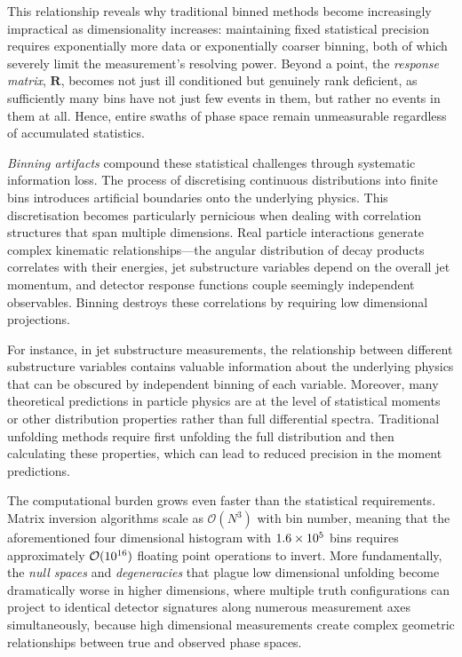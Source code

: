            This relationship reveals why traditional binned methods become increasingly impractical as dimensionality increases: maintaining fixed statistical precision requires exponentially more data or exponentially coarser binning, both of which severely limit the measurement's resolving power.
            Beyond a point, the \textit{response matrix}, \(\mathbf{R}\), becomes not just ill conditioned but genuinely rank deficient, as sufficiently many bins have not just few events in them, but rather no events in them at all.
            Hence, entire swaths of phase space remain unmeasurable regardless of accumulated statistics.
    
            \emph{Binning artifacts} compound these statistical challenges through systematic information loss.
            The process of discretising continuous distributions into finite bins introduces artificial boundaries  onto the underlying physics.
            This discretisation becomes particularly pernicious when dealing with correlation structures that span multiple dimensions.
            Real particle interactions generate complex kinematic relationships---the angular distribution of decay products correlates with their energies, jet substructure variables depend on the overall jet momentum, and detector response functions couple seemingly independent observables.
            Binning destroys these correlations by requiring low dimensional projections.
            
            For instance, in jet substructure measurements, the relationship between different substructure variables contains valuable information about the underlying physics that can be obscured by independent binning of each variable.
            Moreover, many theoretical predictions in particle physics are at the level of statistical moments or other distribution properties rather than full differential spectra.
            Traditional unfolding methods require first unfolding the full distribution and then calculating these properties, which can lead to reduced precision in the moment predictions.
    
            The computational burden grows even faster than the statistical requirements.
            Matrix inversion algorithms scale as \(\mathcal O(N^3)\) with bin number, meaning that the aforementioned four dimensional histogram with \(\num{1.6d5}\) bins requires approximately \(\mathcal{O}(\num{d16})\) floating point operations to invert.
            More fundamentally, the \emph{null spaces} and \emph{degeneracies} that plague low dimensional unfolding become dramatically worse in higher dimensions, where multiple truth configurations can project to identical detector signatures along numerous measurement axes simultaneously, because high dimensional measurements create complex geometric relationships between true and observed phase spaces.

